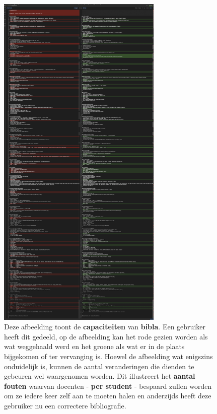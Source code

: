 \begin{figure}[ht]
    \centering
    \includegraphics[width=0.7\textwidth]{./files/bibla_is_useful.jpeg}
    \caption[Effectiviteit bibla]{Deze afbeelding toont de \textbf{capaciteiten} van \textbf{bibla}. Een gebruiker heeft dit gedeeld, op de afbeelding kan het rode gezien worden als wat weggehaald werd en het groene als wat er in de plaats bijgekomen of ter vervanging is. Hoewel de afbeelding wat enigszins onduidelijk is, kunnen de aantal veranderingen die dienden te gebeuren wel waargenomen worden. Dit illustreert het \textbf{aantal fouten} waarvan docenten - \textbf{per student} - bespaard zullen worden om ze iedere keer zelf aan te moeten halen en anderzijds heeft deze gebruiker nu een correctere bibliografie.}
    \label{fig:bibla-is-useful}
\end{figure}

